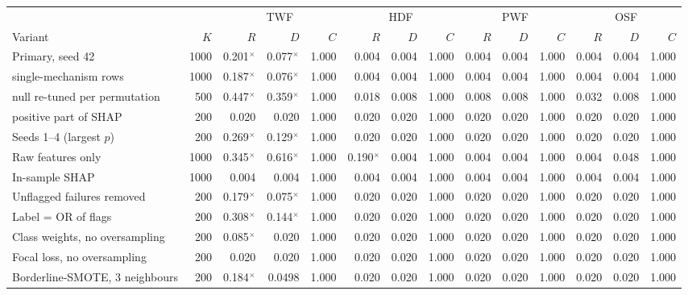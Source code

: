 \begin{tabular}{@{}lrrrrrrrrrrrrr@{}}
\toprule
& & \multicolumn{3}{c}{TWF} & \multicolumn{3}{c}{HDF} & \multicolumn{3}{c}{PWF} & \multicolumn{3}{c}{OSF} \\
\cmidrule(lr){3-5}\cmidrule(lr){6-8}\cmidrule(lr){9-11}\cmidrule(lr){12-14}
Variant & $K$ & $R$ & $D$ & $C$ & $R$ & $D$ & $C$ & $R$ & $D$ & $C$ & $R$ & $D$ & $C$ \\
\midrule
Primary, seed 42 & 1000 & 0.201$^{\times}$ & 0.077$^{\times}$ & 1.000 & 0.004 & 0.004 & 1.000 & 0.004 & 0.004 & 1.000 & 0.004 & 0.004 & 1.000 \\
\quad single-mechanism rows & 1000 & 0.187$^{\times}$ & 0.076$^{\times}$ & 1.000 & 0.004 & 0.004 & 1.000 & 0.004 & 0.004 & 1.000 & 0.004 & 0.004 & 1.000 \\
\quad null re-tuned per permutation & 500 & 0.447$^{\times}$ & 0.359$^{\times}$ & 1.000 & 0.018 & 0.008 & 1.000 & 0.008 & 0.008 & 1.000 & 0.032 & 0.008 & 1.000 \\
\quad positive part of SHAP & 200 & 0.020 & 0.020 & 1.000 & 0.020 & 0.020 & 1.000 & 0.020 & 0.020 & 1.000 & 0.020 & 0.020 & 1.000 \\
Seeds 1--4 (largest $p$) & 200 & 0.269$^{\times}$ & 0.129$^{\times}$ & 1.000 & 0.020 & 0.020 & 1.000 & 0.020 & 0.020 & 1.000 & 0.020 & 0.020 & 1.000 \\
Raw features only & 1000 & 0.345$^{\times}$ & 0.616$^{\times}$ & 1.000 & 0.190$^{\times}$ & 0.004 & 1.000 & 0.004 & 0.004 & 1.000 & 0.004 & 0.048 & 1.000 \\
In-sample SHAP & 1000 & 0.004 & 0.004 & 1.000 & 0.004 & 0.004 & 1.000 & 0.004 & 0.004 & 1.000 & 0.004 & 0.004 & 1.000 \\
\addlinespace
Unflagged failures removed & 200 & 0.179$^{\times}$ & 0.075$^{\times}$ & 1.000 & 0.020 & 0.020 & 1.000 & 0.020 & 0.020 & 1.000 & 0.020 & 0.020 & 1.000 \\
Label = OR of flags & 200 & 0.308$^{\times}$ & 0.144$^{\times}$ & 1.000 & 0.020 & 0.020 & 1.000 & 0.020 & 0.020 & 1.000 & 0.020 & 0.020 & 1.000 \\
Class weights, no oversampling & 200 & 0.085$^{\times}$ & 0.020 & 1.000 & 0.020 & 0.020 & 1.000 & 0.020 & 0.020 & 1.000 & 0.020 & 0.020 & 1.000 \\
Focal loss, no oversampling & 200 & 0.020 & 0.020 & 1.000 & 0.020 & 0.020 & 1.000 & 0.020 & 0.020 & 1.000 & 0.020 & 0.020 & 1.000 \\
Borderline-SMOTE, 3 neighbours & 200 & 0.184$^{\times}$ & 0.0498 & 1.000 & 0.020 & 0.020 & 1.000 & 0.020 & 0.020 & 1.000 & 0.020 & 0.020 & 1.000 \\

\end{tabular}
